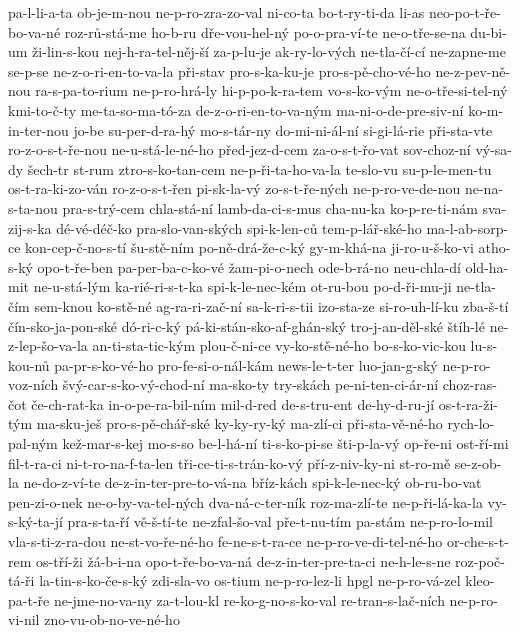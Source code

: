 pa-l-li-a-ta
ob-je-m-nou
ne-p-ro-zra-zo-val
ni-co-ta
bo-t-ry-ti-da
li-as
neo-po-t-ře-bo-va-né
roz-rů-stá-me
ho-b-ru
dře-vou-hel-ný
po-o-pra-ví-te
ne-o-tře-se-na
du-bi-um
ži-lin-s-kou
nej-h-ra-tel-něj-ší
za-p-lu-je
ak-ry-lo-vých
ne-tla-čí-cí
ne-zapne-me
se-p-se
ne-z-o-ri-en-to-va-la
při-stav
pro-s-ka-ku-je
pro-s-pě-cho-vé-ho
ne-z-pev-ně-nou
ra-s-pa-to-rium
ne-p-ro-hrá-ly
hi-p-po-k-ra-tem
vo-s-ko-vým
ne-o-tře-si-tel-ný
kmi-to-č-ty
me-ta-so-ma-tó-za
de-z-o-ri-en-to-va-ným
ma-ni-o-de-pre-siv-ní
ko-m-in-ter-nou
jo-be
su-per-d-ra-hý
mo-s-tár-ny
do-mi-ni-ál-ní
si-gi-lá-rie
při-sta-vte
ro-z-o-s-t-ře-nou
ne-u-stá-le-né-ho
před-jez-d-cem
za-o-s-t-řo-vat
sov-choz-ní
vý-sa-dy
šech-tr
st-rum
ztro-s-ko-tan-cem
ne-p-ři-ta-ho-va-la
te-slo-vu
su-p-le-men-tu
os-t-ra-ki-zo-ván
ro-z-o-s-t-řen
pi-sk-la-vý
zo-s-t-ře-ných
ne-p-ro-ve-de-nou
ne-na-s-ta-nou
pra-s-trý-cem
chla-stá-ní
lamb-da-ci-s-mus
cha-nu-ka
ko-p-re-ti-nám
sva-zij-s-ka
dé-vé-déč-ko
pra-slo-van-ských
spi-k-len-ců
tem-p-lář-ské-ho
ma-l-ab-sorp-ce
kon-cep-č-no-s-tí
šu-stě-ním
po-ně-drá-že-c-ký
gy-m-khá-na
ji-ro-u-š-ko-vi
atho-s-ký
opo-t-ře-ben
pa-per-ba-c-ko-vé
žam-pi-o-nech
ode-b-rá-no
neu-chla-dí
old-ha-mit
ne-u-stá-lým
ka-rié-ri-s-t-ka
spi-k-le-nec-kém
ot-ru-bou
po-d-ři-mu-ji
ne-tla-čím
sem-knou
ko-stě-né
ag-ra-ri-zač-ní
sa-k-ri-s-tii
izo-sta-ze
si-ro-uh-lí-ku
zba-š-tí
čín-sko-ja-pon-ské
dó-ri-c-ký
pá-ki-stán-sko-af-ghán-ský
tro-j-an-děl-ské
štíh-lé
ne-z-lep-šo-va-la
an-ti-sta-tic-kým
plou-č-ni-ce
vy-ko-stě-né-ho
bo-s-ko-vic-kou
lu-s-kou-nů
pa-pr-s-ko-vé-ho
pro-fe-si-o-nál-kám
news-le-t-ter
luo-jan-g-ský
ne-p-ro-voz-ních
švý-car-s-ko-vý-chod-ní
ma-sko-ty
try-skách
pe-ni-ten-ci-ár-ní
choz-ras-čot
če-ch-rat-ka
in-o-pe-ra-bil-ním
mil-d-red
de-s-tru-ent
de-hy-d-ru-jí
os-t-ra-ži-tým
ma-sku-ješ
pro-s-pě-chář-ské
ky-ky-ry-ký
ma-zlí-ci
při-sta-vě-né-ho
rych-lo-pal-ným
kež-mar-s-kej
mo-s-so
be-l-há-ní
ti-s-ko-pi-se
šti-p-la-vý
op-ře-ni
ost-ří-mi
fil-t-ra-ci
ni-t-ro-na-f-ta-len
tři-ce-ti-s-trán-ko-vý
pří-z-niv-ky-ni
st-ro-mě
se-z-ob-la
ne-do-z-ví-te
de-z-in-ter-pre-to-vá-na
bříz-kách
spi-k-le-nec-ký
ob-ru-bo-vat
pen-zi-o-nek
ne-o-by-va-tel-ných
dva-ná-c-ter-ník
roz-ma-zlí-te
ne-p-ři-lá-ka-la
vy-s-ký-ta-jí
pra-s-ta-ří
vě-š-tí-te
ne-zfal-šo-val
pře-t-nu-tím
pa-stám
ne-p-ro-lo-mil
vla-s-ti-z-ra-dou
ne-st-vo-ře-né-ho
fe-ne-s-t-ra-ce
ne-p-ro-ve-di-tel-né-ho
or-che-s-t-rem
os-tří-ži
žá-b-i-na
opo-t-ře-bo-va-ná
de-z-in-ter-pre-ta-ci
ne-h-le-s-ne
roz-poč-tá-ři
la-tin-s-ko-če-s-ký
zdi-sla-vo
os-tium
ne-p-ro-lez-li
hpgl
ne-p-ro-vá-zel
kleo-pa-t-ře
ne-jme-no-va-ny
za-t-lou-kl
re-ko-g-no-s-ko-val
re-tran-s-lač-ních
ne-p-ro-vi-nil
zno-vu-ob-no-ve-né-ho
